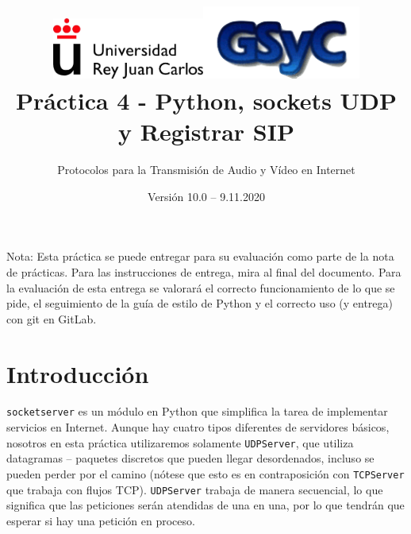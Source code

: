 \documentclass[11pt,a4paper]{article}
\begin{document}
\title{
\vspace{-3.2cm}\hspace{-1.5cm}\includegraphics[height=2cm]{img/urjc.png}\hspace{3.9cm}\includegraphics[height=2.4cm]{img/gsyc.png}\vspace{2.05cm} \\
Práctica 4 - Python, sockets UDP y Registrar SIP}
\author{Protocolos para la Transmisión de Audio y Vídeo en Internet}
\date{Versión 10.0 – 9.11.2020}



\maketitle




Nota: Esta práctica se puede entregar para su evaluación como parte de la nota de prácticas. Para las instrucciones de entrega, mira al final del documento. Para la evaluación de esta entrega se valorará el correcto funcionamiento de lo que se pide, el seguimiento de la guía de estilo de Python y el correcto uso (y entrega) con git en GitLab.


\section{Introducción}

\texttt{socketserver} es un módulo en Python que simplifica la tarea de implementar servicios en Internet. Aunque hay cuatro tipos diferentes de servidores básicos, nosotros en esta práctica utilizaremos solamente \texttt{UDPServer}, que utiliza datagramas -- paquetes discretos que pueden llegar desordenados, incluso se pueden perder por el camino (nótese que esto es en contraposición con \texttt{TCPServer} que trabaja con flujos TCP). \texttt{UDPServer} trabaja de manera secuencial, lo que significa que las peticiones serán atendidas de una en una, por lo que tendrán que esperar si hay una petición en proceso.
\end{document}
